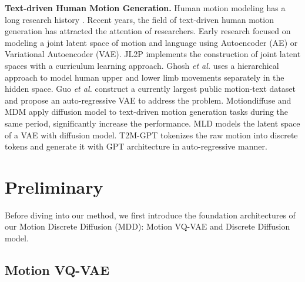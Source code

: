 \documentclass[letterpaper]{article} \usepackage{aaai24}
\begin{document}
\noindent\textbf{Text-driven Human Motion Generation.} Human motion modeling has a long research history \cite{10.1093/oso/9780195073591.001.0001}. 
Recent years, the field of text-driven human motion generation has attracted the attention of researchers.
Early research focused on modeling a joint latent space of motion and language using Autoencoder (AE) or Variational Autoencoder (VAE). 
JL2P \cite{ahuja2019language2pose} implements the construction of joint latent spaces with a curriculum learning approach. 
Ghosh \textit{et al.} \cite{ghosh2023synthesis} uses a hierarchical approach to model human upper and lower limb movements separately in the hidden space. 
Guo \textit{et al.} \cite{guo2022generating} construct a currently largest public motion-text dataset and propose an auto-regressive VAE to address the problem. 
Motiondiffuse \cite{zhang2022motiondiffuse} and MDM \cite{tevet2022human} apply diffusion model to text-driven motion generation tasks during the same period, significantly increase the performance. MLD \cite{chen2023executing} models the latent space of a VAE with diffusion model. T2M-GPT \cite{zhang2023t2mgpt} tokenizes the raw motion into discrete tokens and generate it with GPT architecture in auto-regressive manner.








\section{Preliminary}Before diving into our method, we first introduce the foundation architectures of our Motion Discrete Diffusion (MDD): Motion VQ-VAE and Discrete Diffusion model.

\subsection{Motion VQ-VAE}
\end{document}
